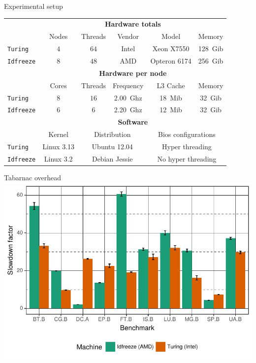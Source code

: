 \documentclass[xcolor={usenames,dvipsnames},hyperref={pdfusetitle}]{beamer}
\begin{document}
\setcounter{framenumber}{\value{finalframe}}
\begin{frame}{Experimental setup}
    \small
    \centering
    \begin{tabular}{lccccc}
        \toprule
        & \multicolumn{5}{c}{\textbf{Hardware totals}}\\
        \cmidrule(lr){2-6}
        & Nodes & Threads & Vendor & Model & Memory \\
        \cmidrule(lr){2-6}
        \texttt{Turing}   & $4$ & $64$ & Intel & Xeon X7550   & \SI{128}{Gib} \\
        \texttt{Idfreeze} & $8$ & $48$ & AMD   & Opteron 6174 & \SI{256}{Gib}\\
        \midrule
        & \multicolumn{5}{c}{\textbf{Hardware per node}}\\
        \cmidrule(lr){2-6}
        & Cores & Threads & Frequency & L3 Cache & Memory \\
        \cmidrule(lr){2-6}
        \texttt{Turing}   & $8$ & $16$ & \SI{2.00}{Ghz}& \SI{18}{Mib} & \SI{32}{Gib} \\
        \texttt{Idfreeze} & $6$ & $6$  & \SI{2.20}{Ghz}& \SI{12}{Mib} & \SI{32}{Gib}\\
        \midrule
        & \multicolumn{5}{c}{\textbf{Software}}\\
        \cmidrule(lr){2-6}
        & Kernel & \multicolumn{2}{c}{Distribution} &
        \multicolumn{2}{c}{Bios configurations} \\
        \cmidrule(lr){2-6}
        \texttt{Turing}   & Linux 3.13 & \multicolumn{2}{c}{Ubuntu 12.04} &
        \multicolumn{2}{c}{Hyper threading} \\
        \texttt{Idfreeze} & Linux 3.2 & \multicolumn{2}{c}{Debian Jessie} &
        \multicolumn{2}{c}{No hyper threading}\\
        \bottomrule
    \end{tabular}
\end{frame}

\setcounter{framenumber}{\value{finalframe}}
\begin{frame}{Tabarnac overhead}
    \includegraphics[width=\linewidth]{tabarnac/slides/tool-ovh.pdf}
\end{frame}
\end{document}
